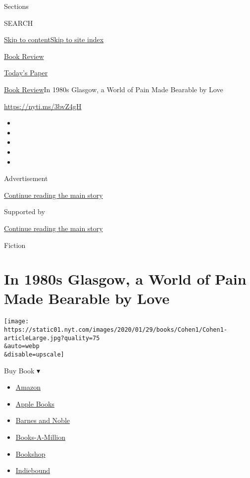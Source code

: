 Sections

SEARCH

\protect\hyperlink{site-content}{Skip to
content}\protect\hyperlink{site-index}{Skip to site index}

\href{https://www.nytimes.com/section/books/review}{Book Review}

\href{https://myaccount.nytimes.com/auth/login?response_type=cookie\&client_id=vi}{}

\href{https://www.nytimes.com/section/todayspaper}{Today's Paper}

\href{/section/books/review}{Book Review}\textbar{}In 1980s Glasgow, a
World of Pain Made Bearable by Love

\url{https://nyti.ms/3bvZ4gH}

\begin{itemize}
\item
\item
\item
\item
\item
\end{itemize}

Advertisement

\protect\hyperlink{after-top}{Continue reading the main story}

Supported by

\protect\hyperlink{after-sponsor}{Continue reading the main story}

Fiction

\hypertarget{in-1980s-glasgow-a-world-of-pain-made-bearable-by-love}{%
\section{In 1980s Glasgow, a World of Pain Made Bearable by
Love}\label{in-1980s-glasgow-a-world-of-pain-made-bearable-by-love}}

\texttt{[image: https://static01.nyt.com/images/2020/01/29/books/Cohen1/Cohen1-articleLarge.jpg?quality=75\\\&auto=webp\\\&disable=upscale]}

Buy Book ▾

\begin{itemize}
\tightlist
\item
  \href{https://www.amazon.com/gp/search?index=books\&tag=NYTBSREV-20\&field-keywords=Shuggie+Bain+Douglas+Stuart}{Amazon}
\item
  \href{https://du-gae-books-dot-nyt-du-prd.appspot.com/buy?title=Shuggie+Bain\&author=Douglas+Stuart}{Apple
  Books}
\item
  \href{https://www.anrdoezrs.net/click-7990613-11819508?url=https\%3A\%2F\%2Fwww.barnesandnoble.com\%2Fw\%2F\%3Fean\%3D9780802148049}{Barnes
  and Noble}
\item
  \href{https://www.anrdoezrs.net/click-7990613-35140?url=https\%3A\%2F\%2Fwww.booksamillion.com\%2Fp\%2FShuggie\%2BBain\%2FDouglas\%2BStuart\%2F9780802148049}{Books-A-Million}
\item
  \href{https://bookshop.org/a/3546/9780802148049}{Bookshop}
\item
  \href{https://www.indiebound.org/book/9780802148049?aff=NYT}{Indiebound}
\end{itemize}

